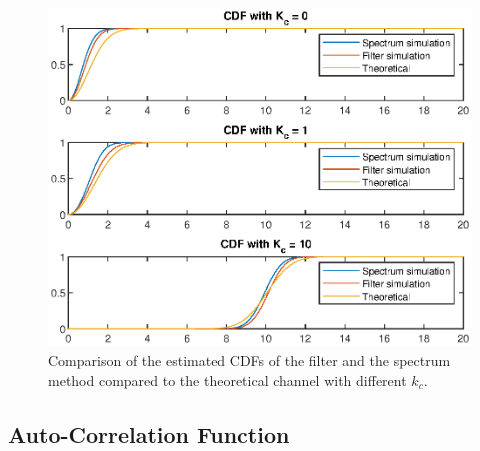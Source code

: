 \documentclass[conference]{IEEEtran}
\begin{document}
  \begin{figure}[H]
        \centering
        \includegraphics[width = \linewidth]{Figures/CDF.eps}
        \caption{Comparison of the estimated CDFs of the filter and the spectrum method compared to the theoretical channel with different $k_{c}$.}
        \label{cdf}
    \end{figure}
    
\subsection{Auto-Correlation Function}
    
\end{document}
